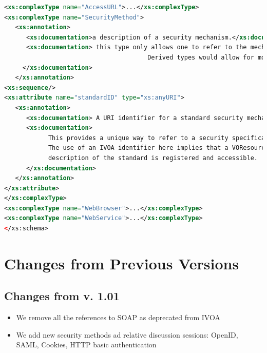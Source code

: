 \documentclass[11pt,a4paper]{ivoa}
\begin{document}
\begin{lstlisting}[language=xml,basicstyle=\footnotesize]
<xs:complexType name="AccessURL">...</xs:complexType>
<xs:complexType name="SecurityMethod">
   <xs:annotation>
      <xs:documentation>a description of a security mechanism.</xs:documentation>
      <xs:documentation> this type only allows one to refer to the mechanism via a URI.  
                                       Derived types would allow for more metadata.
     </xs:documentation>
   </xs:annotation>
<xs:sequence/>
<xs:attribute name="standardID" type="xs:anyURI">
   <xs:annotation>
      <xs:documentation> A URI identifier for a standard security mechanism. </xs:documentation>
      <xs:documentation>
            This provides a unique way to refer to a security specification standard. 
            The use of an IVOA identifier here implies that a VOResource 
            description of the standard is registered and accessible.
      </xs:documentation>
   </xs:annotation>
</xs:attribute>
</xs:complexType>
<xs:complexType name="WebBrowser">...</xs:complexType>
<xs:complexType name="WebService">...</xs:complexType>
</xs:schema>
\end{lstlisting}


\section{Changes from Previous Versions}

 
\subsection {Changes from v. 1.01}
\begin{itemize}
\item We remove all the references to SOAP as deprecated from IVOA
\item We add new security methods ad relative discussion sessions: OpenID, SAML, Cookies, HTTP basic authentication
\end{itemize}



\end{document}
